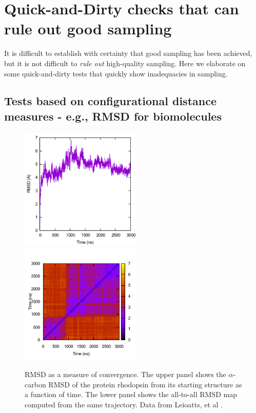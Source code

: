 
\section{Quick-and-Dirty checks that can rule out good sampling}

It is difficult to establish with certainty that good sampling has been achieved, but it is not difficult to \emph{rule out} high-quality sampling.
Here we elaborate on some quick-and-dirty tests that quickly show inadequacies in sampling.

\subsection{Tests based on configurational distance measures - e.g., RMSD for biomolecules}

\begin{figure}
  \includegraphics[width=5.8cm]{figures/rmsd/rmsd}
  \includegraphics[width=5.8cm]{figures/rmsd/rmsds}
  \caption{
  \label{f:rmsd} RMSD as a measure of convergence.  The upper panel shows the
  $\alpha$-carbon RMSD of the protein rhodopsin from its starting structure as a
  function of time.  The lower panel shows the all-to-all RMSD map computed from the same
  trajectory.  Data from Leioatts, et al \cite{Grossfield-2015}.
  }
\end{figure}

